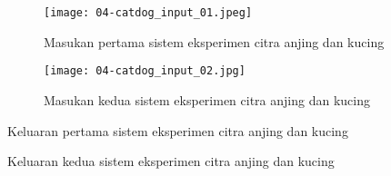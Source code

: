 \begin{figure}[H]
    \centering
    \texttt{[image: 04-catdog\_input\_01.jpeg]}
	\caption{Masukan pertama sistem eksperimen citra anjing dan kucing}\label{fig:04-catdog-input-01}
\end{figure}

\begin{figure}[H]
    \centering
	\texttt{[image: 04-catdog\_input\_02.jpg]}
	\caption{Masukan kedua sistem eksperimen citra anjing dan kucing}\label{fig:04-catdog-input-02}
\end{figure}

\begin{code}
	\caption{Keluaran pertama sistem eksperimen citra anjing dan kucing}\label{listing:31}
\end{code}

\begin{code}
	\caption{Keluaran kedua sistem eksperimen citra anjing dan kucing}\label{listing:32}
\end{code}